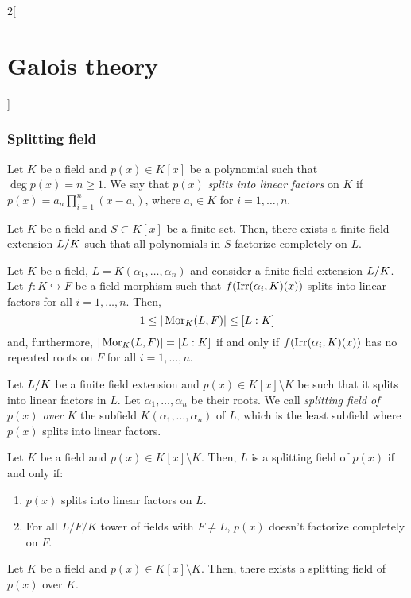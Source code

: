 \documentclass[../../../main.tex]{subfiles}
\begin{document}
\begin{multicols}{2}[\section{Galois theory}]
  \subsubsection{Splitting field}
  \begin{definition}
    Let $K$ be a field and $p(x)\in K[x]$ be a polynomial such that $\deg p(x)=n\geq 1$. We say that $p(x)$ \textit{splits into linear factors} on $K$ if $p(x)=a_n\prod_{i=1}^n(x-a_i)$, where $a_i\in K$ for $i=1,\ldots,n$.
  \end{definition}
  \begin{theorem}
    Let $K$ be a field and $S\subset K[x]$ be a finite set. Then, there exists a finite field extension $\quot{L}{K}$ such that all polynomials in $S$ factorize completely on $L$.
  \end{theorem}
  \begin{theorem}
    Let $K$ be a field, $L=K(\alpha_1,\ldots,\alpha_n)$ and consider a finite field extension $\quot{L}{K}$. Let $f:K\hookrightarrow F$ be a field morphism such that $f(\operatorname{Irr}(\alpha_i,K)(x))$ splits into linear factors for all $i=1,\ldots,n$. Then, $$1\leq|\operatorname{Mor}_K(L,F)|\leq [L:K]$$ and, furthermore, $|\operatorname{Mor}_K(L,F)|=[L:K]$ if and only if $f(\operatorname{Irr}(\alpha_i,K)(x))$ has no repeated roots on $F$ for all $i=1,\ldots,n$.
  \end{theorem}
  \begin{definition}
    Let $\quot{L}{K}$ be a finite field extension and $p(x)\in K[x]\setminus K$ be such that it splits into linear factors in $L$. Let $\alpha_1,\ldots,\alpha_n$ be their roots. We call \textit{splitting field of $p(x)$ over $K$} the subfield $K(\alpha_1,\ldots,\alpha_n)$ of $L$, which is the least subfield where $p(x)$ splits into linear factors.
  \end{definition}
  \begin{prop}
    Let $K$ be a field and $p(x)\in K[x]\setminus K$. Then, $L$ is a splitting field of $p(x)$ if and only if:
    \begin{enumerate}
      \item $p(x)$ splits into linear factors on $L$.
      \item For all $L/F/K$ tower of fields with $F\ne L$, $p(x)$ doesn't factorize completely on $F$.
    \end{enumerate}
  \end{prop}
  \begin{theorem}
    Let $K$ be a field and $p(x)\in K[x]\setminus K$. Then, there exists a splitting field of $p(x)$ over $K$.

\end{theorem}
\end{multicols}
\end{document}
